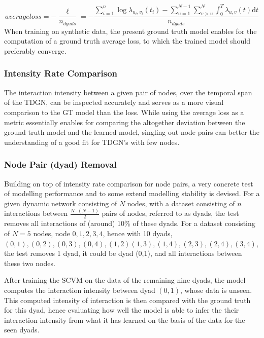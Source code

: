\begin{equation}
   average loss = - \frac{\ell}{n_{dyads}} = - \frac{\sum_{i=1}^n \log \lambda_{u_i,v_i} (t_i) - \sum_{u=1}^{N-1} \sum_{v > u}^{N} \int_{0}^T \lambda_{u,v}(t) \mathrm{d} t}{n_{dyads}}
    \label{eq:LogLikelihoodFuncExplicit}
\end{equation}
When training on synthetic data, the present ground truth model enables for the computation of a ground truth average loss, to which the trained model should preferably converge.


\subsubsection{Intensity Rate Comparison}
\label{sec:Method:Evaluation:Intensity}
The interaction intensity between a given pair of nodes, over the temporal span of the TDGN, can be inspected accurately and serves as a more visual comparison to the GT model than the loss. 
While using the average loss as a metric essentially enables for comparing the altogether deviation between the ground truth model and the learned model, singling out node pairs can better the understanding of a good fit for TDGN's with few nodes.




\subsubsection{Node Pair (dyad) Removal}
\label{sec:Method:Evaluation:NodePairRemoval}
Building on top of intensity rate comparison for node pairs, a very concrete test of modelling performance and to some extend modelling stability is devised.
For a given dynamic network consisting of $N$ nodes, with a dataset consisting of $n$ interactions between $\frac{N\cdot(N-1)}{2}$ pairs of nodes, referred to as dyads, the test removes all interactions of (around) 10\% of these dyads.
For a dataset consisting of $N = 5$ nodes, node $0,1,2,3,4$, hence with 10 dyads, $(0,1), (0,2), (0,3), (0,4), (1,2) (1,3), (1,4), (2,3), (2,4), (3,4)$, the test removes 1 dyad, it could be dyad (0,1), and all interactions between these two nodes.

After training the SCVM on the data of the remaining nine dyads, the model computes the interaction intensity between dyad $(0,1)$, whose data is unseen.
This computed intensity of interaction is then compared with the ground truth for this dyad, hence evaluating how well the model is able to infer the their interaction intensity from what it has learned on the basis of the data for the seen dyads.


